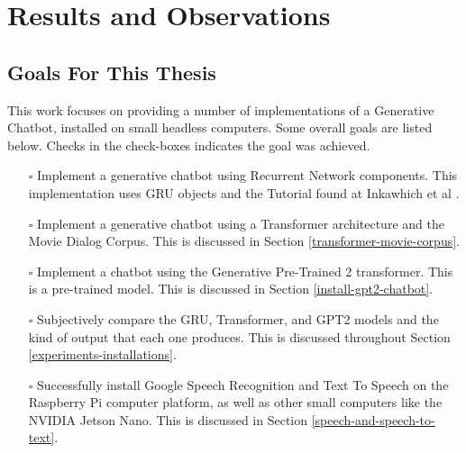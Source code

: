 \chapter{Results and Observations}

\iffalse

\section{Goals For This Thesis}
This work focuses on providing a number of implementations of a Generative Chatbot, installed on small headless computers. Some overall goals are listed below. Checks in the check-boxes indicates the goal was achieved.

\begin{itemize}
	
	\item[\rlap{\raisebox{0.3ex}{\hspace{0.4ex}\tiny \ding{52}}}$\square$] Implement a generative chatbot using Recurrent Network components. This implementation uses GRU objects and the Tutorial found at Inkawhich et al \cite{2018Inkawhich}.
	
	\item[\rlap{\raisebox{0.3ex}{\hspace{0.4ex}\tiny \ding{52}}}$\square$] Implement a generative chatbot using a Transformer architecture and the Movie Dialog Corpus. This is discussed in Section \ref{transformer-movie-corpus}. %
	
	\item[\rlap{\raisebox{0.3ex}{\hspace{0.4ex}\tiny \ding{52}}}$\square$] Implement a chatbot using the Generative Pre-Trained 2 transformer. This is a pre-trained model. This is discussed in Section \ref{install-gpt2-chatbot}.
	
	\item[\rlap{\raisebox{0.3ex}{\hspace{0.4ex}\tiny \ding{52}}}$\square$] Subjectively compare the GRU, Transformer, and GPT2 models and the kind of output that each one produces. This is discussed throughout Section \ref{experiments-installations}.
	
	\item[\rlap{\raisebox{0.3ex}{\hspace{0.4ex}\tiny \ding{52}}}$\square$] Successfully install Google Speech Recognition and Text To Speech on the Raspberry Pi computer platform, as well as other small computers like the NVIDIA Jetson Nano. This is discussed in Section \ref{speech-and-speech-to-text}.
	

\end{itemize}

